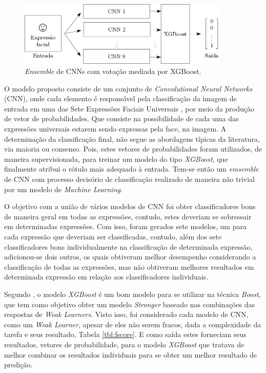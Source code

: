 \begin{figure}[!htb]
    \centering
    \caption{\emph{Ensemble} de CNNs com votação mediada por XGBoost.} \label{fig:ensemble}
    \includegraphics[width=0.9\textwidth]{images/ensemble-elloa.png}
\end{figure}



\iffalse
O modelo proposto consiste de um conjunto de \emph{Convolutional Neural Networks} (CNN), onde cada elemento é responsável pela classificação da imagem de entrada em uma das Sete Expressões Faciais Universais \cite{}, por meio da produção de vetor de probabilidades. Que consiste na possibilidade de cada uma das expressões universais estarem sendo expressas pela face, na imagem. A determinação da classificação final, não segue as abordagens típicas da literatura, via maioria ou consenso. Pois, estes vetores de probabilidades foram utilizados, de maneira supervisionada, para treinar um modelo do tipo \emph{XGBoost}, que finalmente atribui o rótulo mais adequado à entrada. Tem-se então um \emph{emsemble} de CNN com processo decisório de classificação realizado de maneira não trivial por um modelo de \emph{Machine Learning}.

O objetivo com a união de vários modelos de CNN foi obter classificadores bons de maneira geral em todas as expressões, contudo, estes deveriam se sobressair em determinadas expressões. Com isso, foram gerados sete modelos, um para cada expressão que deveriam ser classificadas, contudo, além dos sete classificadores bons individualmente na classificação de determinada expressão, adicionou-se dois outros, os quais obtiveram melhor desempenho considerando a classificação de todas as expressões, mas não obtiveram melhores resultados em determinada expressão em relação aos classificadores individuais.

Segundo \cite{}, o modelo \emph{XGBoost} é um bom modelo para se utilizar na técnica \emph{Boost}, que tem como objetivo obter um modelo \emph{Stronger} baseado nas combinações das respostas de \emph{Weak Learners}. Visto isso, foi considerado cada modelo de CNN, como um \emph{Weak Learner}, apesar de eles não serem fracos, dada a complexidade da tarefa e seus resultado, Tabela \ref{tbl:fscore}. E como saída estes forneciam seus resultados, vetores de probabilidade, para o modelo \emph{XGBoost} que tratava de melhor combinar os resultados individuais para se obter um melhor resultado de predição.

